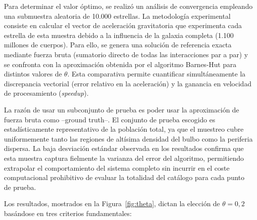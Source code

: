 Para determinar el valor óptimo, se realizó un análisis de convergencia empleando una submuestra aleatoria de 10.000 estrellas.
La metodología experimental consiste en calcular el vector de aceleración gravitatoria que experimenta cada estrella de esta muestra debido a la influencia de la galaxia completa (1.100 millones de cuerpos).
Para ello, se genera una solución de referencia exacta mediante fuerza bruta (sumatorio directo de todas las interacciones par a par) y se confronta con la aproximación obtenida por el algoritmo Barnes-Hut para distintos valores de $\theta$.
Esta comparativa permite cuantificar simultáneamente la discrepancia vectorial (error relativo en la aceleración) y la ganancia en velocidad de procesamiento (\textit{speedup}).

La razón de usar un subconjunto de prueba es poder usar la aproximación de fuerza bruta como --ground truth--.
El conjunto de prueba escogido es estadísticamente representativo de la población total, ya que el muestreo cubre uniformemente tanto las regiones de altísima densidad del bulbo como la periferia dispersa.
La baja desviación estándar observada en los resultados confirma que esta muestra captura fielmente la varianza del error del algoritmo, permitiendo extrapolar el comportamiento del sistema completo sin incurrir en el coste computacional prohibitivo de evaluar la totalidad del catálogo para cada punto de prueba.

Los resultados, mostrados en la Figura~\ref{fig:theta}, dictan la elección de \textbf{$\theta = 0,2$} basándose en tres criterios fundamentales:

